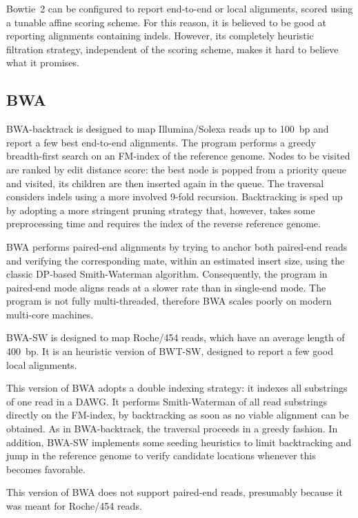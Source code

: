 Bowtie~2 can be configured to report end-to-end or local alignments, scored using a tunable affine scoring scheme.
For this reason, it is believed to be good at reporting alignments containing indels.
However, its completely heuristic filtration strategy, independent of the scoring scheme, makes it hard to believe what it promises.


\subsection{BWA}

BWA-backtrack \citep{BWA} is designed to map Illumina/Solexa reads up to 100~bp and report a few best end-to-end alignments.
The program performs a greedy breadth-first search on an FM-index of the reference genome.
Nodes to be visited are ranked by edit distance score: the best node is popped from a priority queue and visited, its children are then inserted again in the queue.
The traversal considers indels using a more involved 9-fold recursion.
Backtracking is sped up by adopting a more stringent pruning strategy that, however, takes some preprocessing time and requires the index of the reverse reference genome.

BWA performs paired-end alignments by trying to anchor both paired-end reads and verifying the corresponding mate, within an estimated insert size, using the classic DP-based Smith-Waterman algorithm.
Consequently, the program in paired-end mode aligns reads at a slower rate than in single-end mode.
The program is not fully multi-threaded, therefore BWA scales poorly on modern multi-core machines.

BWA-SW \citep{BWA-SW} is designed to map Roche/454 reads, which have an average length of 400~bp.
It is an heuristic version of BWT-SW, designed to report a few good local alignments.

This version of BWA adopts a double indexing strategy: it indexes all substrings of one read in a DAWG.
It performs Smith-Waterman of all read substrings directly on the FM-index, by backtracking as soon as no viable alignment can be obtained.
As in BWA-backtrack, the traversal proceeds in a greedy fashion.
In addition, BWA-SW implements some seeding heuristics to limit backtracking and jump in the reference genome to verify candidate locations whenever this becomes favorable.

This version of BWA does not support paired-end reads, presumably because it was meant for Roche/454 reads.

